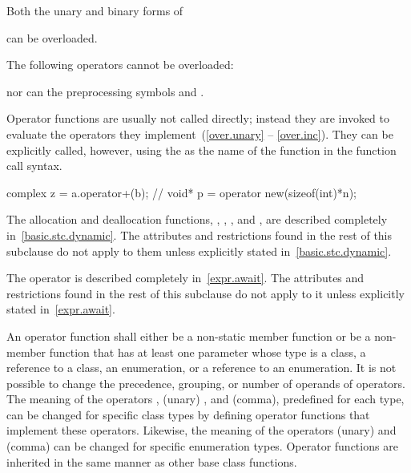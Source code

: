 \pnum
Both the unary and binary forms of
\begin{ncsimplebnf}\obeyspaces
\terminal{+      -      *      \&}
\end{ncsimplebnf}
can be overloaded.

\pnum
\begin{note}
%
The following operators cannot be overloaded:
\begin{ncsimplebnf}\obeyspaces
{}
\end{ncsimplebnf}
nor can the preprocessing symbols
\tcode{\#}
and
\tcode{\#\#}.
\end{note}

\pnum
{}%
Operator functions are usually not called directly; instead they are invoked
to evaluate the operators they implement~(\ref{over.unary} -- \ref{over.inc}).
They can be explicitly called, however, using the
as the name of the function in the function call syntax.
\begin{example}
\begin{codeblock}
complex z = a.operator+(b);     // 
void* p = operator new(sizeof(int)*n);
\end{codeblock}
\end{example}

\pnum
The allocation and deallocation functions,
 ,
 ,
 , and
 ,
are described completely in~\ref{basic.stc.dynamic}.
The attributes and restrictions
found in the rest of this subclause do not apply to them unless explicitly
stated in~\ref{basic.stc.dynamic}.

\pnum
The  operator is described completely in~\ref{expr.await}.
The attributes and restrictions
found in the rest of this subclause do not apply to it unless explicitly
stated in~\ref{expr.await}.

\pnum
{}%
An operator function
shall either be a non-static member function or be a non-member function that
has at least one parameter whose type is a class, a reference to a class, an
enumeration, or a reference to an enumeration.
It is not possible to change the precedence, grouping, or number of operands
of operators.
The meaning of
the operators \tcode{=}, (unary) \tcode{\&}, and \tcode{,} (comma),
predefined for each type, can be changed for specific class types by
defining operator functions that implement these operators.
Likewise, the meaning of the operators (unary) \tcode{\&} and \tcode{,} (comma)
can be changed for specific enumeration types.
%
Operator functions are inherited in the same manner as other base class
functions.

